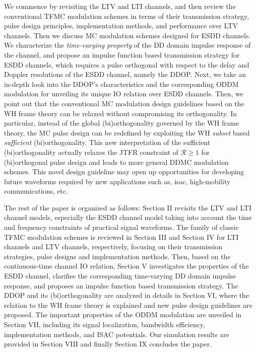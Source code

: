 \documentclass[journal]{IEEEtran}
\begin{document}
We commence by revisiting the LTV and LTI channels, and then review the conventional TFMC modulation schemes in terms of their transmission strategy, pulse design principles, implementation methods, and  performance over LTV channels. Then we discuss MC modulation schemes designed for ESDD channels.
We characterize the \emph{time-varying property} of the DD domain impulse response of the channel, and propose an impulse function based transmission strategy for ESDD channels, which requires a pulse orthogonal with respect to the delay and Doppler resolutions of the ESDD channel, namely the DDOP.
Next, we take an in-depth look into the DDOP's characteristics and the corresponding ODDM modulation for unveiling its unique IO relation over ESDD channels.
Then, we point out that the conventional MC modulation design guidelines based on the WH frame theory can be relaxed without compromising its orthogonality. %
In particular, instead of the global (bi)orthogonality governed by the WH frame theory, the MC pulse design can be redefined by exploiting the WH \emph{subset} based \emph{sufficient} (bi)orthogonality. This new interpretation of the sufficient (bi)orthogonality actually relaxes the JTFR constraint of $\mathcal R\ge 1$ for (bi)orthogonal pulse design and leads to more general DDMC modulation schemes. This novel design guideline may open up opportunities for developing future waveforms required by new applications such as, \ac{isac}, high-mobility communications, etc.


The rest of the paper is organized as follows:
Section II revisits the LTV and LTI channel models, especially the ESDD channel model taking into account the time and frequency constraints of practical signal waveforms. The family of classic TFMC modulation schemes is reviewed in Section III and Section IV for LTI channels and LTV channels, respectively, focusing on their transmission strategies, pulse designs and implementation methods. Then, based on the continuous-time channel IO relation, Section V investigates the properties of the ESDD channel, clarifies the corresponding time-varying DD domain impulse response, and proposes an impulse function based  transmission strategy. The DDOP and its (bi)orthogonality are analyzed in details in Section VI, where the relation to the WH frame theory is explained and new pulse design guidelines are proposed. The important properties of the ODDM modulation are unveiled in Section VII, including its signal localization, bandwidth efficiency, implementation methods, and ISAC potentials. Our simulation results are provided in Section VIII and finally Section IX concludes the paper.
\end{document}
